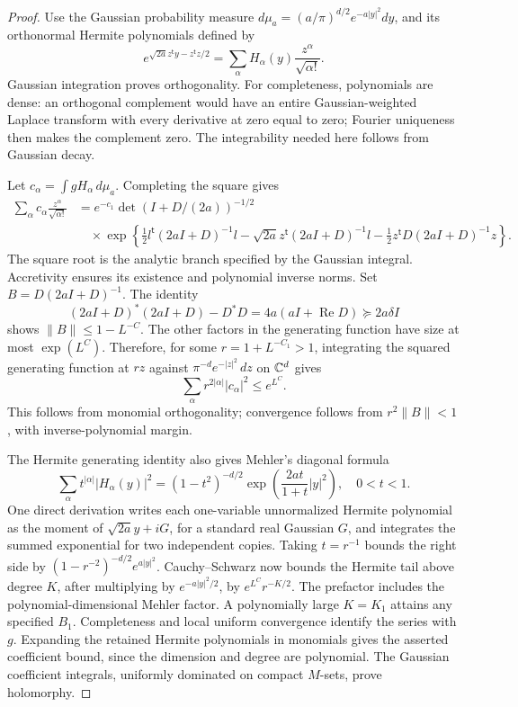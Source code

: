 \begin{proof}
Use the Gaussian probability measure
\(d\mu_a=(a/\pi)^{d/2}e^{-a|y|^2}dy\), and its orthonormal Hermite
polynomials defined by
\[
 e^{\sqrt{2a}z^{\mathsf t}y-z^{\mathsf t}z/2}
       =\sum_\alpha H_\alpha(y)\frac{z^\alpha}{\sqrt{\alpha!}}.
\]
Gaussian integration proves orthogonality. For completeness,
polynomials are dense: an orthogonal complement would have an entire
Gaussian-weighted Laplace transform with every derivative at zero
equal to zero; Fourier uniqueness then makes the complement zero.
The integrability needed here follows from Gaussian decay.

Let \(c_\alpha=\int gH_\alpha\,d\mu_a\). Completing the square gives
\begin{align*}
 \sum_\alpha c_\alpha\frac{z^\alpha}{\sqrt{\alpha!}}
 &=e^{-c_1}\det(I+D/(2a))^{-1/2}\\
 &\quad\times\exp\!\left\{
 \tfrac12l^{\mathsf t}(2aI+D)^{-1}l
 -\sqrt{2a}z^{\mathsf t}(2aI+D)^{-1}l
 -\tfrac12z^{\mathsf t}D(2aI+D)^{-1}z\right\}.
\end{align*}
The square root is the analytic branch specified by the Gaussian
integral. Accretivity ensures its existence and polynomial inverse
norms. Set \(B=D(2aI+D)^{-1}\). The identity
\[
 (2aI+D)^*(2aI+D)-D^*D
       =4a(aI+\operatorname{Re}D)\succeq2a\delta I
\]
shows \(\|B\|\le1-L^{-C}\). The other factors in the generating
function have size at most \(\exp(L^C)\). Therefore, for some
\(r=1+L^{-C_1}>1\), integrating the squared generating function at
\(rz\) against \(\pi^{-d}e^{-|z|^2}\,dz\) on \(\mathbb C^d\) gives
\[
 \sum_\alpha r^{2|\alpha|}|c_\alpha|^2\le e^{L^C}.
\]
This follows from monomial orthogonality; convergence follows from
\(r^2\|B\|<1\), with inverse-polynomial margin.

The Hermite generating identity also gives Mehler's diagonal formula
\cite[equation~18.18.28]{DLMF18}
\[
 \sum_\alpha t^{|\alpha|}|H_\alpha(y)|^2
 =(1-t^2)^{-d/2}
       \exp\!\left(\frac{2at}{1+t}|y|^2\right),\quad 0<t<1.
\]
One direct derivation writes each one-variable unnormalized Hermite
polynomial as the moment of \(\sqrt{2a}y+iG\), for a standard real
Gaussian \(G\), and integrates the summed exponential for two
independent copies. Taking \(t=r^{-1}\) bounds the right side by
\((1-r^{-2})^{-d/2}e^{a|y|^2}\). Cauchy--Schwarz now bounds the
Hermite tail above degree \(K\), after multiplying by
\(e^{-a|y|^2/2}\), by
\(e^{L^C}r^{-K/2}\). The prefactor includes the polynomial-dimensional
Mehler factor. A polynomially large \(K=K_1\) attains any specified
\(B_1\). Completeness and local uniform convergence identify the
series with \(g\). Expanding the retained Hermite polynomials in
monomials gives the asserted coefficient bound, since the dimension
and degree are polynomial. The Gaussian coefficient integrals,
uniformly dominated on compact \(M\)-sets, prove holomorphy.
\end{proof}

